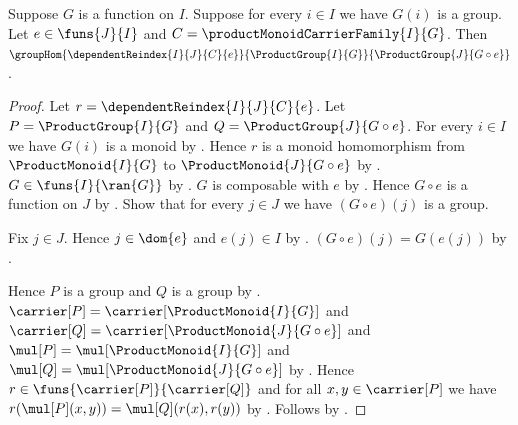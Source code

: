 \begin{theorem}\label{product_group_reindex_hom}
    Suppose $G$ is a function on $I$.
    Suppose for every $i\in I$ we have $G(i)$ is a group.
    Let $e\in\funs{J}{I}$ and $C=\productMonoidCarrierFamily{I}{G}$.
    Then
        $\groupHom{\dependentReindex{I}{J}{C}{e}}{
            \ProductGroup{I}{G}}{\ProductGroup{J}{G\circ e}}$.
\end{theorem}
\begin{proof}
    Let $r=\dependentReindex{I}{J}{C}{e}$.
    Let $P=\ProductGroup{I}{G}$ and $Q=\ProductGroup{J}{G\circ e}$.
    For every $i\in I$ we have $G(i)$ is a monoid by
        .
    Hence $r$ is a monoid homomorphism from $\ProductMonoid{I}{G}$ to
        $\ProductMonoid{J}{G\circ e}$ by
        .
    $G\in\funs{I}{\ran{G}}$ by
        .
    $G$ is composable with $e$ by .
    Hence $G\circ e$ is a function on $J$ by
        .
    Show that for every $j\in J$ we have $(G\circ e)(j)$ is a group.
    \begin{subproof}
        Fix $j\in J$.
        Hence $j\in\dom{e}$ and $e(j)\in I$ by
            .
        $(G\circ e)(j)=G(e(j))$ by
            .
    \end{subproof}
    Hence $P$ is a group and $Q$ is a group by
        .
    $\carrier[P]=\carrier[\ProductMonoid{I}{G}]$ and
        $\carrier[Q]=\carrier[\ProductMonoid{J}{G\circ e}]$ and
        $\mul[P]=\mul[\ProductMonoid{I}{G}]$ and
        $\mul[Q]=\mul[\ProductMonoid{J}{G\circ e}]$ by
        .
    Hence $r\in\funs{\carrier[P]}{\carrier[Q]}$ and
        for all $x,y\in\carrier[P]$ we have
            $r(\mul[P](x,y))=\mul[Q](r(x),r(y))$ by
        .
    Follows by .
\end{proof}

